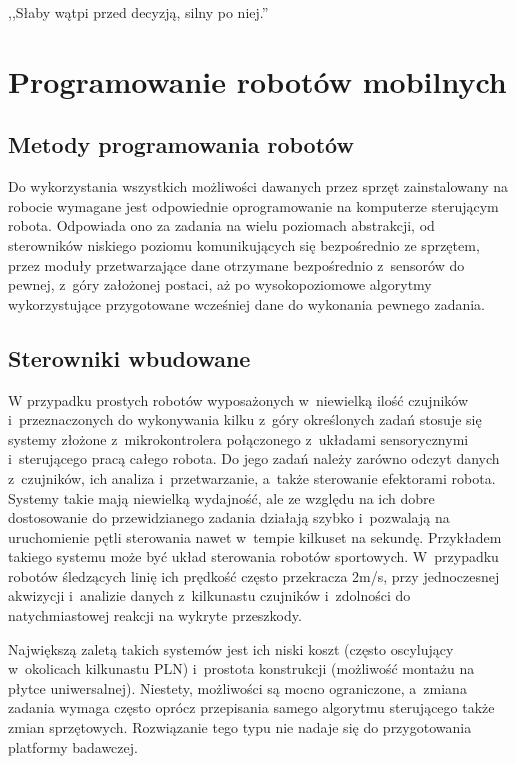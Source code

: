 

\begin{savequote}[70mm]
,,Słaby wątpi przed decyzją, silny po niej.''
\end{savequote}


\chapter{Programowanie robotów mobilnych}
\label{chap:programowanie}

\section{Metody programowania robotów}

Do wykorzystania wszystkich możliwości dawanych przez sprzęt zainstalowany na robocie
wymagane jest odpowiednie oprogramowanie na komputerze sterującym robota. Odpowiada
ono za zadania na wielu poziomach abstrakcji, od sterowników niskiego poziomu
komunikujących się bezpośrednio ze sprzętem, przez moduły przetwarzające dane otrzymane
bezpośrednio z~sensorów do pewnej, z~góry założonej postaci, aż po wysokopoziomowe
algorytmy wykorzystujące przygotowane wcześniej dane do wykonania pewnego zadania.

\section{Sterowniki wbudowane}

W przypadku prostych robotów wyposażonych w~niewielką ilość czujników
i~przeznaczonych do wykonywania kilku z~góry określonych zadań stosuje się systemy
złożone z~mikrokontrolera połączonego z~układami sensorycznymi i~sterującego pracą
całego robota. Do jego zadań należy zarówno odczyt danych z~czujników, ich analiza
i~przetwarzanie, a~także sterowanie efektorami robota. Systemy takie mają niewielką
wydajność, ale ze względu na ich dobre dostosowanie do przewidzianego zadania działają
szybko i~pozwalają na uruchomienie pętli sterowania nawet w~tempie kilkuset na sekundę.
Przykładem takiego systemu może być układ sterowania robotów sportowych. W~przypadku
robotów śledzących linię ich prędkość często przekracza 2m/s, przy jednoczesnej
akwizycji i~analizie danych z~kilkunastu czujników i~zdolności do natychmiastowej
reakcji na wykryte przeszkody.

Największą zaletą takich systemów jest ich niski koszt (często oscylujący w~okolicach
kilkunastu PLN) i~prostota konstrukcji (możliwość montażu na płytce uniwersalnej).
Niestety, możliwości są mocno ograniczone, a~zmiana zadania wymaga często oprócz przepisania
samego algorytmu sterującego także zmian sprzętowych. Rozwiązanie tego typu nie nadaje
się do przygotowania platformy badawczej.

